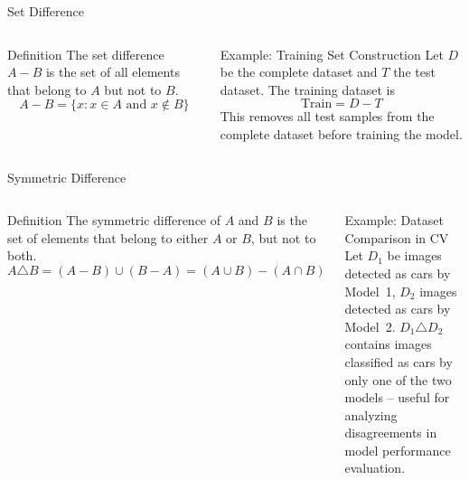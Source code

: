 \documentclass[aspectratio=169]{beamer}
\newcommand{\circA}{(0,0) circle (1.3)}
\newcommand{\circB}{(1.3,0) circle (1.3)}
\begin{document}
\begin{frame}{Set Difference}
\begin{columns}
\begin{block}{Definition}
The set difference $A-B$ is the set of all elements that belong to $A$ but not to $B$.
$$A-B=\{x : x\in A \text{ and } x\notin B\}$$
\end{block}
\begin{exampleblock}{Example: Training Set Construction}
Let $D$ be the complete dataset and $T$ the test dataset. The training dataset is
$$\text{Train}=D-T$$
This removes all test samples from the complete dataset before training the model.
\end{exampleblock}
\centering
{}
\end{columns}
\end{frame}

\begin{frame}{Symmetric Difference}
\begin{columns}
\begin{block}{Definition}
The symmetric difference of $A$ and $B$ is the set of elements that belong to either $A$ or $B$, but not to both.
$$A\triangle B=(A-B)\cup(B-A)=(A\cup B)-(A\cap B)$$
\end{block}
\begin{exampleblock}{Example: Dataset Comparison in CV}
Let $D_1$ be images detected as cars by Model~1, $D_2$ images detected as cars by Model~2. $D_1\triangle D_2$ contains images classified as cars by only one of the two models -- useful for analyzing disagreements in model performance evaluation.
\end{exampleblock}
\centering
{}
\end{columns}
\end{frame}
\end{document}
